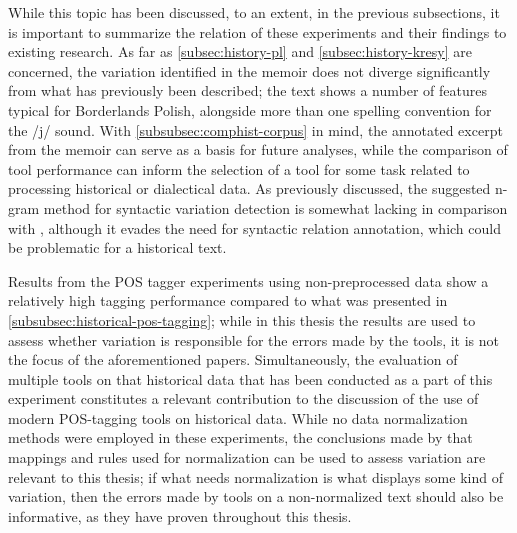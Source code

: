 While this topic has been discussed, to an extent, in the previous subsections, it is important to summarize the relation of these experiments and their findings to existing research. As far as \autoref{subsec:history-pl} and \autoref{subsec:history-kresy} are concerned, the variation identified in the memoir does not diverge significantly from what has previously been described; the text shows a number of features typical for Borderlands Polish, alongside more than one spelling convention for the /j/ sound. With \autoref{subsubsec:comphist-corpus} in mind, the annotated excerpt from the memoir can serve as a basis for future analyses, while the comparison of tool performance can inform the selection of a tool for some task related to processing historical or dialectical data. As previously discussed, the suggested n-gram method for syntactic variation detection is somewhat lacking in comparison with \citet{johannsen-etal-2015-cross}, although it evades the need for syntactic relation annotation, which could be problematic for a historical text. 

Results from the POS tagger experiments using non-preprocessed data show a relatively high tagging performance compared to what was presented in \autoref{subsubsec:historical-pos-tagging}; while in this thesis the results are used to assess whether variation is responsible for the errors made by the tools, it is not the focus of the aforementioned papers. Simultaneously, the evaluation of multiple tools on that historical data that has been conducted as a part of this experiment constitutes a relevant contribution to the discussion of the use of modern POS-tagging tools on historical data. While no data normalization methods were employed in these experiments, the conclusions made by \citet{dipper-waldenberger-2017-investigating} that mappings and rules used for normalization can be used to assess variation are relevant to this thesis; if what needs normalization is what displays some kind of variation, then the errors made by tools on a non-normalized text should also be informative, as they have proven throughout this thesis. 








